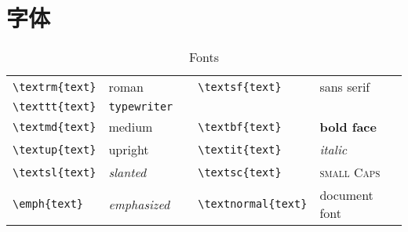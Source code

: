 \documentclass[a4paper,11pt]{article}%
\begin{document}
\section{字体}
\begin{table}[htp]
       \caption{Fonts}    
\begin{tabular}{llcll}
\hline
    \verb+\textrm{text}+ & \textrm{roman} &\quad & \verb+\textsf{text}+ & \textsf{sans serif} \\
    \verb+\texttt{text}+ & \texttt{typewriter} &\quad &  & \\
    \verb+\textmd{text}+ & \textmd{medium} &\quad & \verb+\textbf{text}+ & \textbf{bold face} \\
    \verb+\textup{text}+ & \textup{upright} &\quad & \verb+\textit{text}+ & \textit{italic} \\
    \verb+\textsl{text}+ & \textsl{slanted} &\quad & \verb+\textsc{text}+ & \textsc{small Caps} \\
    \verb+\emph{text}+ & \emph{emphasized} &\quad & \verb+\textnormal{text}+ & \textnormal{document font} \\
    \hline


\end{tabular}
\end{table}
\end{document}
